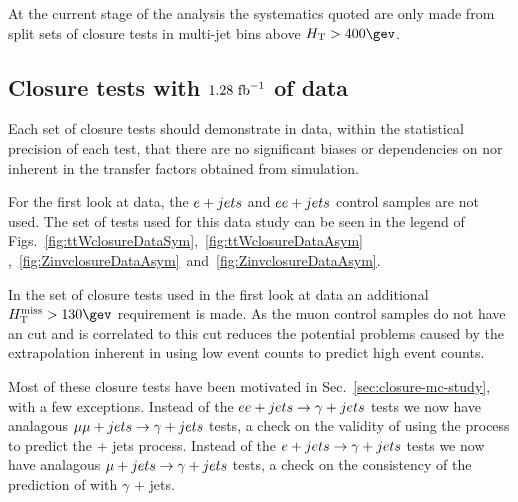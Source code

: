 At the current stage of the analysis the systematics quoted are only
made from split sets of closure tests in multi-jet bins above
$\scalht>400\gev$. 

\subsection{Closure tests with $1.28~\text{fb}^{-1}$ of data}
\label{sec:closure-data-study}

Each set of closure tests should demonstrate in data, within the
statistical precision of each test, that there are no significant
biases or dependencies on \njet nor \scalht inherent in the transfer
factors obtained from simulation. 

For the first look at data, the $e + jets$ and $ee + jets$ control samples are
not used. 
The set of tests used for
this data study can be seen in the legend of
Figs.~\ref{fig:ttWclosureDataSym},~\ref{fig:ttWclosureDataAsym}
,~\ref{fig:ZinvclosureDataAsym}~and~\ref{fig:ZinvclosureDataAsym}.

In the set of closure tests used in the first look at
data an additional $\mht>130\gev$ requirement is made. As the muon
control samples do not have an \alphat cut and \mht is correlated to
\alphat this cut reduces the potential problems
caused by the extrapolation inherent in using low \mht event counts to
predict high \mht event counts.


Most of these closure tests have been motivated in
Sec.~\ref{sec:closure-mc-study}, with a few exceptions. Instead of the
$ee + jets\rightarrow\gamma + jets$ tests we now have analagous
$\mu\mu + jets\rightarrow\gamma + jets$ tests, a check on the validity of using the \gj
process to predict the \znunu + jets process. Instead of the 
$e + jets\rightarrow\gamma + jets$ tests we now have analagous
$\mu + jets\rightarrow\gamma + jets$ tests, a check on 
the consistency of the prediction of \wej with $\gamma$ + jets.

